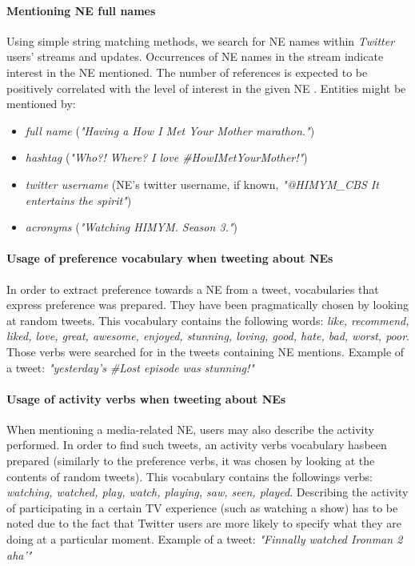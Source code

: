 \paragraph{Mentioning NE full names}
Using simple string matching methods, we search for NE names within \textit{Twitter} users' streams and updates.
Occurrences of NE names in the stream indicate interest in the NE mentioned. The
number of references is expected to be positively correlated with the level of interest in the given NE \cite{twitter-content-is-it}.
Entities might be mentioned by:
\begin{itemize}
  \item \textit{full name} (\eg \textit{"Having a How I Met Your Mother marathon."})
  \item \textit{hashtag} (\eg \textit{"Who?! Where? I love \#HowIMetYourMother!"})
  \item \textit{twitter username} (NE's twitter username, if known, \eg \textit{"@HIMYM\_CBS It entertains the spirit"})
  \item \textit{acronyms} (\eg \textit{"Watching HIMYM. Season 3."})
\end{itemize}
\paragraph{Usage of preference vocabulary when tweeting about NEs}
In order to extract preference towards a NE from a tweet, vocabularies that express
preference was prepared. They have been pragmatically chosen by looking at random tweets.
This vocabulary contains the following words: \textit{like, recommend, liked, love, great,
awesome, enjoyed, stunning, loving, good, hate, bad, worst, poor}.
Those verbs were searched for in the tweets containing NE mentions.
Example of a tweet: \textit{"yesterday's \#Lost episode was stunning!"}
\paragraph{Usage of activity verbs when tweeting about NEs}
When mentioning a media-related NE, users may also describe the activity performed.
In order to find such tweets, an activity verbs vocabulary hasbeen prepared (similarly to
the preference verbs, it was chosen by looking at the contents of random tweets).
This vocabulary contains the followings verbs: \textit{watching, watched, play,
watch, playing, saw, seen, played}.
Describing the activity of participating in a certain TV experience (such
as watching a show) has to be noted due to the fact that Twitter users are more
likely to specify what they are doing at a particular moment.
Example of a tweet: \textit{"Finnally watched Ironman 2 aha'"}

